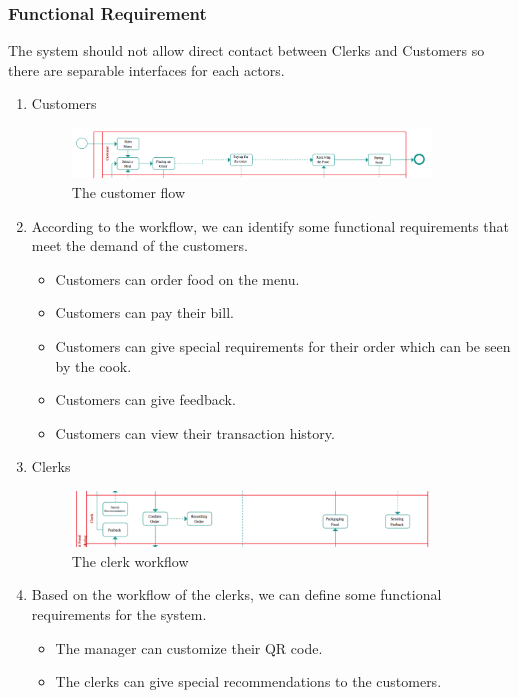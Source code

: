 \documentclass[a4paper]{article}
\numberwithin{equation}{section}
\begin{document}
\subsubsection{Functional Requirement}
The system should not allow direct contact between Clerks and Customers so there are separable interfaces for each actors.
\begin{enumerate}
  \item{Customers}
        \begin{figure}[H]
          \centering
          \includegraphics[width=0.9\textwidth]{./assets/t1/Customer_flow.png}
          \caption{The customer flow}
        \end{figure}
  \item[]According to the workflow, we can identify some functional requirements that meet the demand of the customers.
        \begin{itemize}
          \item Customers can order food on the menu.
          \item Customers can pay their bill.
          \item Customers can give special requirements for their order which can be seen by the cook.
          \item Customers can give feedback.
          \item Customers can view their transaction history.
        \end{itemize}
  \item{Clerks}
        \begin{figure}[H]
          \centering
          \includegraphics[width=0.9\textwidth]{./assets/t1/Clerk_workflow.png}
          \caption{The clerk workflow}
        \end{figure}
  \item[]Based on the workflow of the clerks, we can define some functional requirements for the system.
        \begin{itemize}
          \item The manager can customize their QR code.
          \item The clerks can give special recommendations to the customers.
        \end{itemize}
\end{enumerate}
\end{document}
